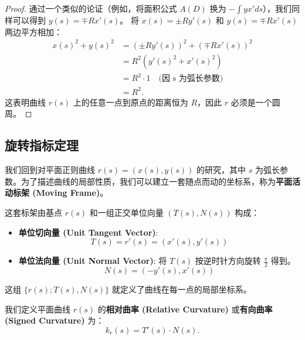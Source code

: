 \documentclass[lang=cn,10pt,thmcnt=section]{elegantbook}
\begin{document}
\begin{proof}
通过一个类似的论证（例如，将面积公式 $A(D)$ 换为 $-\int y x' ds$），我们同样可以得到 $y(s) = \mp R x'(s)$。
将 $x(s) = \pm R y'(s)$ 和 $y(s) = \mp R x'(s)$ 两边平方相加：
\begin{align*}
    x(s)^2 + y(s)^2 &= (\pm R y'(s))^2 + (\mp R x'(s))^2 \\
    &= R^2 (y'(s)^2 + x'(s)^2) \\
    &= R^2 \cdot 1 \quad \text{(因 s 为弧长参数)} \\
    &= R^2.
\end{align*}
这表明曲线 $r(s)$ 上的任意一点到原点的距离恒为 $R$，因此 $r$ 必须是一个圆周。
\end{proof}

\subsection{旋转指标定理}
我们回到对平面正则曲线 $r(s) = (x(s), y(s))$ 的研究，其中 $s$ 为弧长参数。为了描述曲线的局部性质，我们可以建立一套随点而动的坐标系，称为\textbf{平面活动标架 (Moving Frame)}。

这套标架由基点 $r(s)$ 和一组正交单位向量 $(T(s), N(s))$ 构成：
\begin{itemize}
    \item \textbf{单位切向量 (Unit Tangent Vector)}:
    \[
    T(s) = r'(s) = (x'(s), y'(s))
    \]
    \item \textbf{单位法向量 (Unit Normal Vector)}: 将 $T(s)$ 按逆时针方向旋转 $\frac{\pi}{2}$ 得到。
    \[
    N(s) = (-y'(s), x'(s))
    \]
\end{itemize}
这组 $\{r(s); T(s), N(s)\}$ 就定义了曲线在每一点的局部坐标系。

\begin{definition}[相对曲率]
    我们定义平面曲线 $r(s)$ 的\textbf{相对曲率 (Relative Curvature)} 或\textbf{有向曲率 (Signed Curvature)} 为：
    \[
    k_r(s) = T'(s) \cdot N(s).
    \]
\end{definition}
\end{document}

